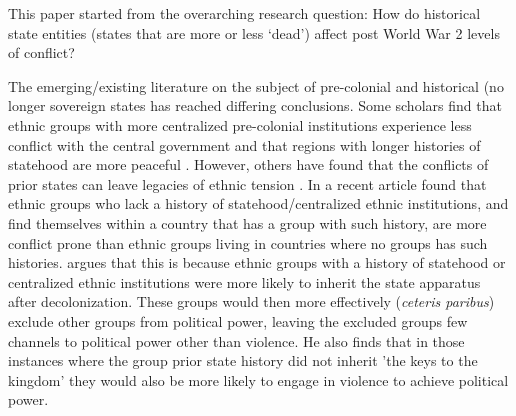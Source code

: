 \documentclass[12pt]{article}
\begin{document}
This paper started from the overarching research question: How do historical
state entities (states that are more or less `dead') affect post World War 2
levels of conflict?

The emerging/existing literature on the subject of pre-colonial and historical
(no longer sovereign states has reached differing conclusions.
Some scholars find that ethnic groups with more centralized pre-colonial
institutions experience less conflict with the central government \citep{
Wig2016} and that regions with longer histories of statehood are more peaceful
\citep{Depetris-Chauvin2016}. However, others have found that the 
conflicts of prior states can leave legacies of ethnic tension \citep{
Besley2014}.
In a recent article \citet{Paine2019} found that ethnic groups who lack a
history of statehood/centralized ethnic institutions, and find themselves 
within a country that has a group with such history, are more conflict prone 
than ethnic groups living in countries where no groups has such histories.
\citet{Paine2019} argues that this is because ethnic groups with a history of 
statehood or centralized ethnic institutions were more likely to inherit the 
state apparatus after decolonization. 
These groups would then more effectively (\emph{ceteris paribus}) exclude other 
groups from political power, leaving the excluded groups few channels to 
political power other than violence.
He also finds that in those instances where the group prior state history did 
not inherit 'the keys to the kingdom' they would also be more likely to engage
in violence to achieve political power.


\end{document}
